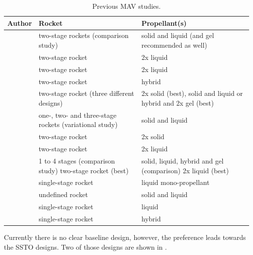 \begin{table}[!ht]
\begin{center}
\caption{Previous \ac{MAV} studies.}
\label{tab:refmavstud}
\begin{tabular}{|p{5cm}|p{5cm}|p{5cm}|}
\hline 
\textbf{Author} 		 &\textbf{Rocket} & \textbf{Propellant(s)} \\ \hline \hline
\cite{whitehead1997} 		& two-stage rockets (comparison study)  & solid and liquid (and gel recommended as well)  \\ \hline
\cite{guernsey1998} 		& two-stage rocket & 2x liquid  \\ \hline
\cite{desai1998} 	& two-stage rocket & 2x liquid  \\ \hline
\cite{stone1999} 	& two-stage rocket & hybrid  \\ \hline \hline
\cite{stephenson2002} 		& two-stage rocket (three different designs) & 2x solid (best), solid and liquid or hybrid and 2x gel (best)  \\ \hline
\cite{whitehead2005} 		& one-, two- and three-stage rockets (variational study)  & solid and liquid  \\ \hline
\cite{stephenson2006} & two-stage rocket & 2x solid  \\ \hline \hline
\cite{sengupta2012} 		& two-stage rocket & 2x liquid  \\ \hline
\cite{trinidad2012} 		& 1 to 4 stages (comparison study) two-stage rocket (best)  & solid, liquid, hybrid and gel (comparison) 2x liquid (best) \\ \hline
\cite{mungas2012}	& single-stage rocket & liquid mono-propellant  \\ \hline
\cite{mppg2012}	 & undefined rocket & solid and liquid  \\ \hline \hline
\cite{vaughan2016technology} & single-stage rocket & liquid \\ \hline
\cite{karp2016technology} & single-stage rocket & hybrid \\ \hline
 		
\end{tabular}
\end{center}
\end{table} 


Currently there is no clear baseline design, however, the preference leads towards the \ac{SSTO} designs. Two of those designs are shown in . \\ 

